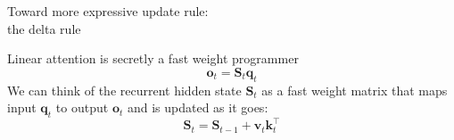 

\begin{frame}{}
    \centering
    \LARGE
    Toward more expressive update rule: \\the delta rule
\end{frame}

\begin{frame}{Linear attention is secretly a fast weight programmer}
\[
    \mathbf{o}_t = \mathbf{S}_t \mathbf{q}_t
\]
We can think of the recurrent hidden state $\mathbf{S}_t$ as a fast weight matrix that maps input $\mathbf{q}_t$ to output $\mathbf{o}_t$ and is updated as it goes:
\[\mathbf{S}_t = \mathbf{S}_{t-1} + \mathbf{v}_t\mathbf{k}_t^\top\]

\end{frame}




